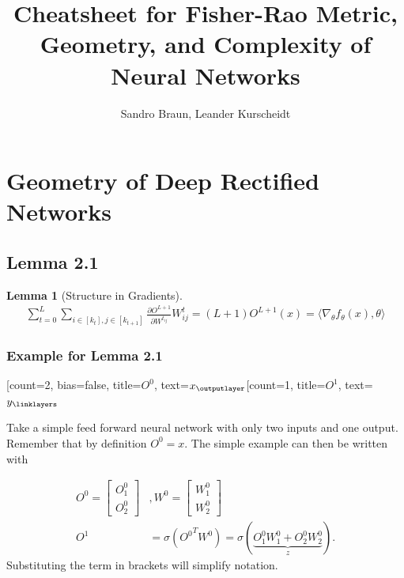 \documentclass[a4paper]{article}
\title{Cheatsheet for Fisher-Rao Metric, Geometry, and Complexity of Neural Networks}
\author{Sandro Braun, Leander Kurscheidt}
\newtheorem{lemma}[theorem]{Lemma}
\begin{document}
\maketitle
\begin{abstract}
\end{abstract}
\section{Geometry of Deep Rectified Networks}


\subsection{Lemma 2.1}

\begin{lemma}[Structure in Gradients]
	\begin{align}
		\label{lemma_structure_in_gradient}
		\sum_{t=0}^{L} \sum_{i \in [k_t], j \in [k_{t+1}]} \frac{\partial O^{L+1}}{\partial W^{t_{ij}}} W^t_{ij} = (L+1)O^{L+1}(x) = \langle \nabla_\theta f_\theta (x), \theta \rangle
	\end{align}
\end{lemma}

\subsubsection{Example for Lemma 2.1}

\begin{minipage}{.5\textwidth}
	\begin{neuralnetwork}[height=2]
		\newcommand{\nodetextx}[2]{$x_#2$}
		\newcommand{\nodetexty}[2]{$y_#2$}
		[count=2, bias=false, title=$O^0$, text=\nodetextx]
		\outputlayer[count=1, title=$O^1$, text=\nodetexty] \linklayers
	\end{neuralnetwork}
\end{minipage}

Take a simple feed forward neural network with only two inputs and one output. Remember that by definition $O^0 = x$. The simple example can then be written with

\begin{align}
	\label{eq_simple_nn}
	O^0 = 	\begin{bmatrix}
				O^0_1 \\ 
				O^0_2
			\end{bmatrix} &,
	W^0 = 	\begin{bmatrix}
				W^0_1 \\
				W^0_2
			\end{bmatrix} \\
			O^1 &= \sigma({O^0}^T W^0) = \sigma(
											\underbrace{O^0_1 W^0_1 + O^0_2 W^0_2}_z
											).
\end{align}
Substituting the term in brackets will simplify notation.
\end{document}
